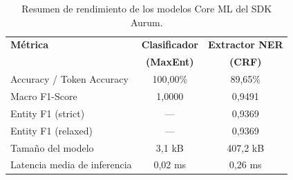 \begin{table}[H]
\caption{Resumen de rendimiento de los modelos Core ML del SDK Aurum.}
\centering
\begin{tabular}{@{}lcc@{}}
\toprule
\textbf{Métrica} & \textbf{Clasificador} & \textbf{Extractor NER} \\
                  & \textbf{(MaxEnt)}     & \textbf{(CRF)} \\
\midrule
Accuracy / Token Accuracy     & 100,00\% & 89,65\% \\
Macro F1-Score                & 1,0000   & 0,9491   \\
Entity F1 (strict)            & ---     & 0,9369   \\
Entity F1 (relaxed)           & ---     & 0,9369   \\
Tamaño del modelo             & 3,1 kB   & 407,2 kB   \\
Latencia media de inferencia  & 0,02 ms  & 0,26 ms  \\
\bottomrule
\end{tabular}
\label{tab:resumen-resultados}
\end{table}
